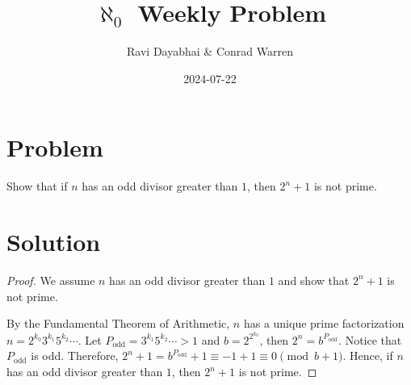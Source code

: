 \documentclass{article}
\title{$\aleph_{0}$ Weekly Problem}
\author{Ravi Dayabhai \& Conrad Warren}
\date{2024-07-22}
\begin{document}
\maketitle

\section*{Problem}

Show that if $n$ has an odd divisor greater than $1$, then $2^{n} + 1$ is not prime.

\section*{Solution}

\begin{proof}

  We assume $n$ has an odd divisor greater than $1$ and show that $2^{n} + 1$ is not prime.

  By the Fundamental Theorem of Arithmetic, $n$ has a unique prime factorization $n = 2^{k_{0}}3^{k_{1}}5^{k_{2}} \cdots $. 
  Let $P_{\text{odd}} = 3^{k_{1}}5^{k_{2}} \cdots > 1$ and $b = 2^{2^{k_{0}}}$, then $2^{n} = b^{P_{\text{odd}}}$.
  Notice that $P_{\text{odd}}$ is odd. Therefore, $2^{n} + 1 = b^{P_{\text{odd}}} + 1 \equiv -1 + 1 \equiv 0 \pmod{b + 1}$.
  Hence, if $n$ has an odd divisor greater than $1$, then $2^{n} + 1$ is not prime.
  
\end{proof}
\end{document}
